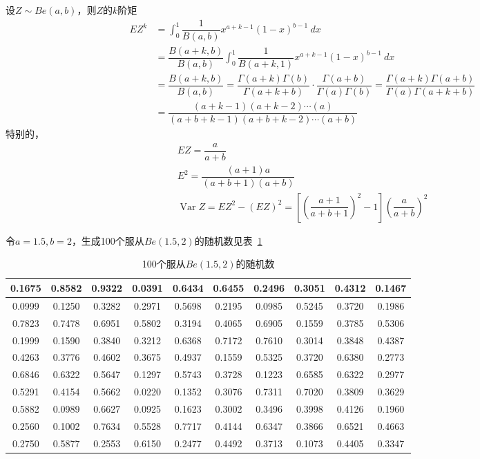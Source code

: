 \begin{note}
    设$Z\sim Be(a, b)$，则$Z$的$k$阶矩
    \[
        \begin{array}{ll}
            EZ^k &= \displaystyle\int_{0}^{1}\dfrac{1}{B(a,b)}x^{a+k-1}(1-x)^{b-1}\ dx\\
            &=\dfrac{B(a+k,b)}{B(a,b)}\displaystyle\int_{0}^{1}\dfrac{1}{B(a+k,1)}x^{a+k-1}(1-x)^{b-1}\ dx\\
            &= \dfrac{B(a+k,b)}{B(a,b)} = \dfrac{\Gamma(a+k)\Gamma(b)}{\Gamma(a+k+b)}\cdot \dfrac{\Gamma(a+b)}{\Gamma(a)\Gamma(b)}=\dfrac{\Gamma(a+k)\Gamma(a+b)}{\Gamma(a)\Gamma(a+k+b)}\\
            &=\dfrac{(a+k-1)(a+k-2)\cdots (a)}{(a+b+k-1)(a+b+k-2)\cdots (a+b)}
        \end{array}
    \]
    特别的，
    \[
        \begin{array}{c}
            EZ = \dfrac{a}{a+b}\\
            E^2 = \dfrac{(a+1)a}{(a+b+1)(a+b)}\\
            \operatorname{Var}Z = EZ^2-(EZ)^2=\left[ (\dfrac{a+1}{a+b+1})^2-1 \right](\dfrac{a}{a+b})^2
        \end{array}
    \]
\end{note}

令$a = 1.5,b = 2$，生成100个服从$Be(1.5,2)$的随机数见表~\ref{tab:Be1point52}

\begin{longtable}[c]{|c|c|c|c|c|c|c|c|c|c|}
    \caption{100个服从$Be(1.5,2)$的随机数}
    \label{tab:Be1point52}\\
    \hline
    0.1675 & 0.8582 & 0.9322 & 0.0391 & 0.6434 & 0.6455 & 0.2496 & 0.3051 & 0.4312 & 0.1467 \\ \hline
    \endfirsthead
    \endhead
    0.0999 & 0.1250 & 0.3282 & 0.2971 & 0.5698 & 0.2195 & 0.0985 & 0.5245 & 0.3720 & 0.1986 \\ \hline
    0.7823 & 0.7478 & 0.6951 & 0.5802 & 0.3194 & 0.4065 & 0.6905 & 0.1559 & 0.3785 & 0.5306 \\ \hline
    0.1999 & 0.1590 & 0.3840 & 0.3212 & 0.6368 & 0.7172 & 0.7610 & 0.3014 & 0.3848 & 0.4387 \\ \hline
    0.4263 & 0.3776 & 0.4602 & 0.3675 & 0.4937 & 0.1559 & 0.5325 & 0.3720 & 0.6380 & 0.2773 \\ \hline
    0.6846 & 0.6322 & 0.5647 & 0.1297 & 0.5743 & 0.3728 & 0.1223 & 0.6585 & 0.6322 & 0.2977 \\ \hline
    0.5291 & 0.4154 & 0.5662 & 0.0220 & 0.1352 & 0.3076 & 0.7311 & 0.7020 & 0.3809 & 0.3629 \\ \hline
    0.5882 & 0.0989 & 0.6627 & 0.0925 & 0.1623 & 0.3002 & 0.3496 & 0.3998 & 0.4126 & 0.1960 \\ \hline
    0.2560 & 0.1002 & 0.7634 & 0.5528 & 0.7717 & 0.4144 & 0.6347 & 0.3866 & 0.6521 & 0.4663 \\ \hline
    0.2750 & 0.5877 & 0.2553 & 0.6150 & 0.2477 & 0.4492 & 0.3713 & 0.1073 & 0.4405 & 0.3347 \\ \hline
\end{longtable}

